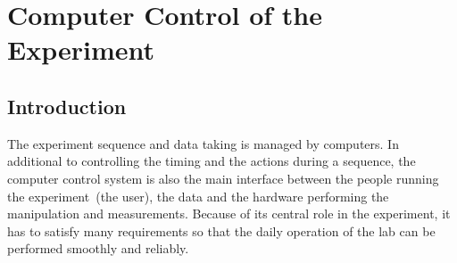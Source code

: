 
\chapter{Computer Control of the Experiment}
\label{ch:computer-control}


\section{Introduction}
\label{ch:computer-control:introduction}

The experiment sequence and data taking is managed by computers.
In additional to controlling the timing and the actions during a sequence,
the computer control system is also the main interface
between the people running the experiment~(the user),
the data and the hardware performing the manipulation and measurements.
Because of its central role in the experiment,
it has to satisfy many requirements so that
the daily operation of the lab can be performed smoothly and reliably.
